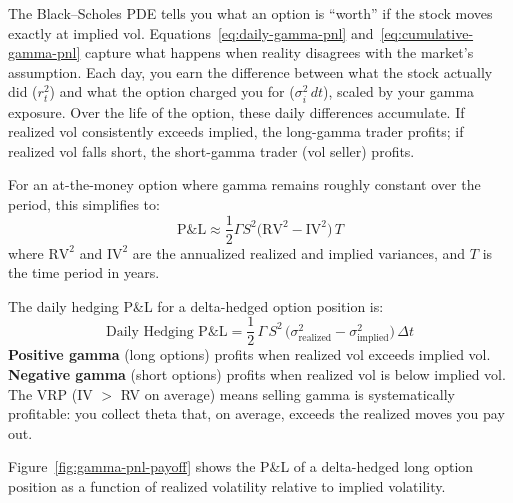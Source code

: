 \begin{intuition}
The Black--Scholes PDE tells you what an option is ``worth'' if the stock moves exactly at implied vol. Equations~\eqref{eq:daily-gamma-pnl} and~\eqref{eq:cumulative-gamma-pnl} capture what happens when reality disagrees with the market's assumption. Each day, you earn the difference between what the stock actually did ($r_t^2$) and what the option charged you for ($\sigma_i^2\,dt$), scaled by your gamma exposure. Over the life of the option, these daily differences accumulate. If realized vol consistently exceeds implied, the long-gamma trader profits; if realized vol falls short, the short-gamma trader (vol seller) profits.
\end{intuition}

For an at-the-money option where gamma remains roughly constant over the period, this simplifies to:
\begin{equation}
\text{P\&L} \approx \frac{1}{2}\Gamma S^2 \bigl(\text{RV}^2 - \text{IV}^2\bigr)\,T
\label{eq:gamma-pnl-simple}
\end{equation}
where $\text{RV}^2$ and $\text{IV}^2$ are the annualized realized and implied variances, and $T$ is the time period in years.

\begin{keyidea}
The daily hedging P\&L for a delta-hedged option position is:
\begin{equation}
\text{Daily Hedging P\&L} = \frac{1}{2}\,\Gamma\,S^2\,\bigl(\sigma_{\text{realized}}^2 - \sigma_{\text{implied}}^2\bigr)\,\Delta t
\end{equation}
\textbf{Positive gamma} (long options) profits when realized vol exceeds implied vol.
\textbf{Negative gamma} (short options) profits when realized vol is below implied vol.
The VRP (IV $>$ RV on average) means selling gamma is systematically profitable: you collect theta that, on average, exceeds the realized moves you pay out.
\end{keyidea}

Figure~\ref{fig:gamma-pnl-payoff} shows the P\&L of a delta-hedged long option position as a function of realized volatility relative to implied volatility.

